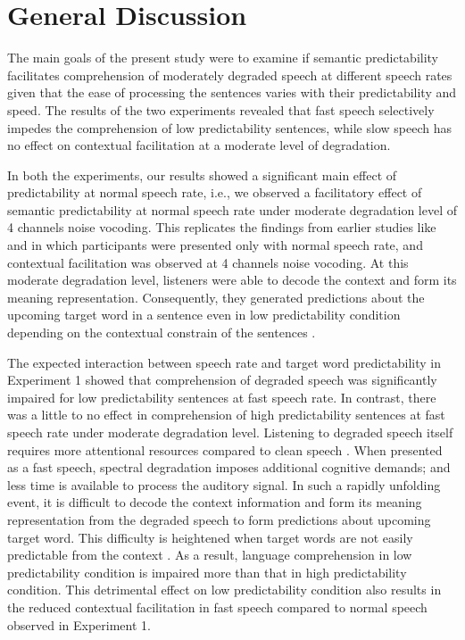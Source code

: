 \documentclass[a4paper, nobind]{templates/ociamthesis}
\begin{document}
\hypertarget{general-discussion-1}{%
\section{General Discussion}\label{general-discussion-1}}

The main goals of the present study were to examine if semantic predictability facilitates comprehension of moderately degraded speech at different speech rates given that the ease of processing the sentences varies with their predictability and speed.
The results of the two experiments revealed that fast speech selectively impedes the comprehension of low predictability sentences, while slow speech has no effect on contextual facilitation at a moderate level of degradation.

In both the experiments, our results showed a significant main effect of predictability at normal speech rate,
i.e., we observed a facilitatory effect of semantic predictability at normal speech rate under moderate degradation level of 4 channels noise vocoding.
This replicates the findings from earlier studies like \textcite{Obleser2010} and \textcite{Bhandari2021} in which participants were presented only with normal speech rate, and contextual facilitation was observed at 4 channels noise vocoding.
At this moderate degradation level, listeners were able to decode the context and form its meaning representation.
Consequently, they generated predictions about the upcoming target word in a sentence even in low predictability condition depending on the contextual constrain of the sentences \autocites{Bhandari2021}[see also,][]{Strauss2013}.

The expected interaction between speech rate and target word predictability in Experiment 1 showed that comprehension of degraded speech was significantly impaired for low predictability sentences at fast speech rate. In contrast, there was a little to no effect in comprehension of high predictability sentences at fast speech rate under moderate degradation level.
Listening to degraded speech itself requires more attentional resources compared to clean speech \autocite{Wild2012}.
When presented as a fast speech, spectral degradation imposes additional cognitive demands; and less time is available to process the auditory signal.
In such a rapidly unfolding event, it is difficult to decode the context information and form its meaning representation from the degraded speech to form predictions about upcoming target word.
This difficulty is heightened when target words are not easily predictable from the context \autocite{Aydelott2004}.
As a result, language comprehension in low predictability condition is impaired more than that in high predictability condition.
This detrimental effect on low predictability condition also results in the reduced contextual facilitation in fast speech compared to normal speech observed in Experiment 1.
\end{document}
